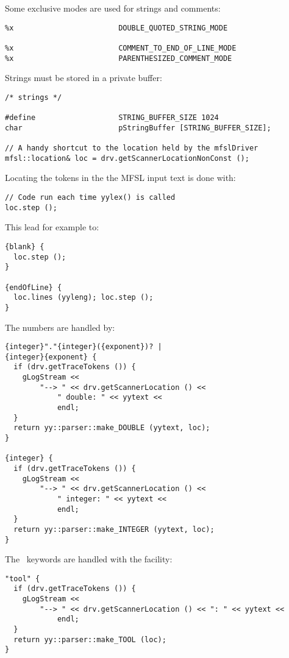 Some exclusive modes are used for strings and comments:
\begin{lstlisting}[language=Flex]
%x                        SINGLE_QUOTED_STRING_MODE
%x                        DOUBLE_QUOTED_STRING_MODE

%x                        COMMENT_TO_END_OF_LINE_MODE
%x                        PARENTHESIZED_COMMENT_MODE
\end{lstlisting}

Strings must be stored in a private buffer:
\begin{lstlisting}[language=Flex]
/* strings */

#define                   STRING_BUFFER_SIZE 1024
char                      pStringBuffer [STRING_BUFFER_SIZE];

// A handy shortcut to the location held by the mfslDriver
mfsl::location& loc = drv.getScannerLocationNonConst ();
\end{lstlisting}

Locating the tokens in the the MFSL input text is done with:
\begin{lstlisting}[language=Flex]
// Code run each time yylex() is called
loc.step ();
\end{lstlisting}

This lead for example to:
\begin{lstlisting}[language=Flex]
{blank} {
  loc.step ();
}

{endOfLine} {
  loc.lines (yyleng); loc.step ();
}
\end{lstlisting}

The numbers are handled by:
\begin{lstlisting}[language=Flex]
{integer}"."{integer}({exponent})? |
{integer}{exponent} {
  if (drv.getTraceTokens ()) {
    gLogStream <<
    	"--> " << drv.getScannerLocation () <<
			" double: " << yytext <<
			endl;
  }
  return yy::parser::make_DOUBLE (yytext, loc);
}

{integer} {
  if (drv.getTraceTokens ()) {
    gLogStream <<
    	"--> " << drv.getScannerLocation () <<
			" integer: " << yytext <<
			endl;
  }
  return yy::parser::make_INTEGER (yytext, loc);
}
\end{lstlisting}

The \mfslLang\ keywords are handled with the  facility:
\begin{lstlisting}[language=Flex]
"tool" {
  if (drv.getTraceTokens ()) {
    gLogStream <<
    	"--> " << drv.getScannerLocation () << ": " << yytext <<
			endl;
  }
  return yy::parser::make_TOOL (loc);
}
\end{lstlisting}

